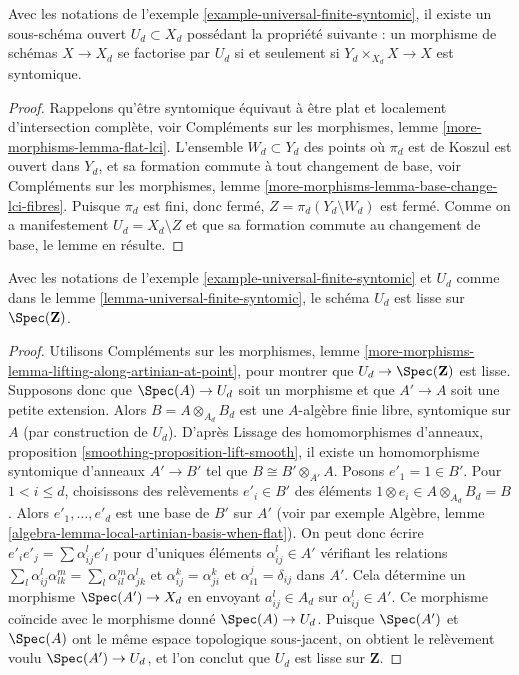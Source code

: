 \begin{lemma}
\label{lemma-universal-finite-syntomic}
Avec les notations de l'exemple \ref{example-universal-finite-syntomic},
il existe un sous-schéma ouvert $U_d \subset X_d$ possédant la propriété suivante :
un morphisme de schémas $X \to X_d$ se factorise par $U_d$ si et seulement
si $Y_d \times_{X_d} X \to X$ est syntomique.
\end{lemma}

\begin{proof}
Rappelons qu'être syntomique équivaut à être plat et
localement d'intersection complète, voir
Compléments sur les morphismes, lemme \ref{more-morphisms-lemma-flat-lci}.
L'ensemble $W_d \subset Y_d$ des points où $\pi_d$ est de Koszul
est ouvert dans $Y_d$, et sa formation commute à tout changement de base, voir
Compléments sur les morphismes, lemme \ref{more-morphisms-lemma-base-change-lci-fibres}.
Puisque $\pi_d$ est fini, donc fermé,
$Z = \pi_d(Y_d \setminus W_d)$ est fermé. Comme on a manifestement $U_d = X_d \setminus Z$
et que sa formation commute au changement de base, le lemme
en résulte.
\end{proof}

\begin{lemma}
\label{lemma-universal-finite-syntomic-smooth}
Avec les notations de l'exemple \ref{example-universal-finite-syntomic}
et $U_d$ comme dans le lemme \ref{lemma-universal-finite-syntomic},
le schéma $U_d$ est lisse sur $\Spec(\mathbf{Z})$.
\end{lemma}

\begin{proof}
Utilisons Compléments sur les morphismes, lemme
\ref{more-morphisms-lemma-lifting-along-artinian-at-point},
pour montrer que $U_d \to \Spec(\mathbf{Z})$ est lisse.
Supposons donc que $\Spec(A) \to U_d$ soit un morphisme
et que $A' \to A$ soit une petite extension. Alors $B = A \otimes_{A_d} B_d$
est une $A$-algèbre finie libre, syntomique sur $A$
(par construction de $U_d$). D'après
Lissage des homomorphismes d'anneaux, proposition \ref{smoothing-proposition-lift-smooth},
il existe un homomorphisme syntomique d'anneaux $A' \to B'$ tel que
$B \cong B' \otimes_{A'} A$. Posons $e'_1 = 1 \in B'$. Pour $1 < i \leq d$,
choisissons des relèvements $e'_i \in B'$ des éléments
$1 \otimes e_i \in A \otimes_{A_d} B_d = B$. Alors $e'_1, \ldots, e'_d$
est une base de $B'$ sur $A'$ (voir par exemple Algèbre, lemme
\ref{algebra-lemma-local-artinian-basis-when-flat}).
On peut donc écrire $e'_i e'_j = \sum \alpha_{ij}^l e'_l$ pour d'uniques
éléments $\alpha_{ij}^l \in A'$ vérifiant les relations
$\sum_l \alpha_{ij}^l \alpha_{lk}^m = \sum_l \alpha_{il}^m \alpha _{jk}^l$
et $\alpha_{ij}^k = \alpha_{ji}^k$ et $\alpha_{i1}^j = \delta_{ij}$
dans $A'$. Cela détermine un morphisme $\Spec(A') \to X_d$ en
envoyant $a_{ij}^l \in A_d$ sur $\alpha_{ij}^l \in A'$. Ce morphisme
coïncide avec le morphisme donné $\Spec(A) \to U_d$. Puisque $\Spec(A')$
et $\Spec(A)$ ont le même espace topologique sous-jacent, on obtient
le relèvement voulu $\Spec(A') \to U_d$, et l'on
conclut que $U_d$ est lisse sur $\mathbf{Z}$.
\end{proof}

